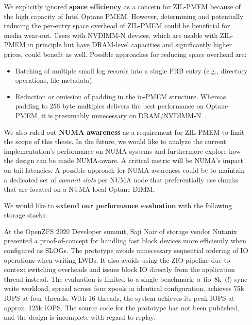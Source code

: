 \documentclass[12pt,a4paper,twoside]{book}
\begin{document}
{We explicitly ignored \textbf{space efficiency} as a concern for ZIL-PMEM because of the high capacity of Intel Optane PMEM.
However, determining and potentially reducing the per-entry space overhead of ZIL-PMEM could be beneficial for media wear-out.
Users with NVDIMM-N devices, which are usable with ZIL-PMEM in principle but have DRAM-level capacities and significantly higher prices, could benefit as well.
Possible approaches for reducing space overhead are:
\begin{itemize}[noitemsep]
    \item Batching of multiple small log records into a single PRB entry (e.g., directory operations, file metadata).
    \item Reduction or omission of padding in the in-PMEM structure.
        Whereas padding to 256 byte multiples delivers the best performance on Optane PMEM, it is presumably unnecessary on DRAM/NVDIMM-N~\cite{yangEmpiricalGuideBehavior2020}.
\end{itemize}

We also ruled out \textbf{NUMA awareness} as a requirement for ZIL-PMEM to limit the scope of this thesis.
In the future, we would like to analyze the current implementation's performance on NUMA systems and furthermore explore how the design can be made NUMA-aware.
A critical metric will be NUMA's impact on tail latencies.
A possible approach for NUMA-awareness could be to maintain a dedicated set of \textit{commit slots} per NUMA node that preferentially use chunks that are located on a NUMA-local Optane DIMM.

We would like to \textbf{extend our performance evaluation} with the following storage stacks:
\begin{description}[noitemsep,leftmargin=1.5cm,labelindent=1cm]
    \item[ZIL ZIO Bypass By Saji Nair]
    At the OpenZFS 2020 Developer summit, Saji Nair of storage vendor Nutanix presented a proof-of-concept for handling fast block devices more efficiently when configured as SLOGs.
    The prototype avoids unnecessary sequential ordering of IO operations when writing LWBs.
    It also avoids using the ZIO pipeline due to context switching overheads and issues block IO directly from the application thread instead.
    The evaluation is limited to a single benchmark: a~fio~8k~(!) sync write workload, spread across four zpools in identical configuration, achieves 75k IOPS at four threads.
    With 16 threads, the system achieves its peak IOPS at approx. 125k IOPS.
    The source code for the prototype has not been published, and the design is incomplete with regard to replay.~\cite{openzfsZILPerformanceImprovements2020}


\end{description}}
\end{document}
